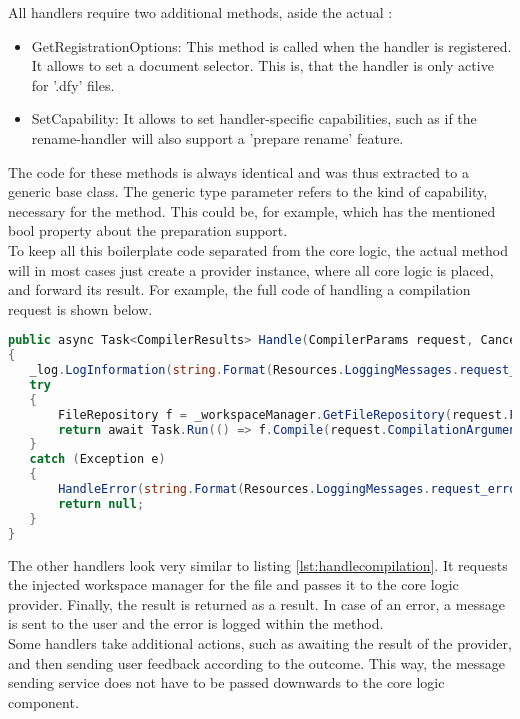 All handlers require two additional methods, aside the actual :
\begin{itemize}
    \item GetRegistrationOptions: This method is called when the handler is registered.
    It allows to set a document selector.
    This is, that the handler is only active for '.dfy' files.
    \item SetCapability: It allows to set handler-specific capabilities, such as if the rename-handler will also support a 'prepare rename' feature.
\end{itemize}
The code for these methods is always identical and was thus extracted to a generic base class.
The generic type parameter refers to the kind of capability, necessary for the  method.
This could be, for example,  which has the mentioned bool property about the preparation support.\\

To keep all this boilerplate code separated from the core logic, the actual  method will in most cases just create a provider instance, where all core logic is placed, and forward its result.
For example, the full code of handling a compilation request is shown below.

\begin{lstlisting}[language=csharp, caption={Handling Compilation}, captionpos=b, label={lst:handlecompilation}]
public async Task<CompilerResults> Handle(CompilerParams request, CancellationToken cancellationToken)
{
   _log.LogInformation(string.Format(Resources.LoggingMessages.request_handle, _method));
   try
   {
       FileRepository f = _workspaceManager.GetFileRepository(request.FileToCompile);
       return await Task.Run(() => f.Compile(request.CompilationArguments), cancellationToken);
   }
   catch (Exception e)
   {
       HandleError(string.Format(Resources.LoggingMessages.request_error, _method), e);
       return null;
   }
}
\end{lstlisting}

The other handlers look very similar to listing \ref{lst:handlecompilation}.
It requests the injected workspace manager for the file and passes it to the core logic provider.
Finally, the result is returned as a result.
In case of an error, a message is sent to the user and the error is logged within the  method.\\

Some handlers take additional actions, such as awaiting the result of the provider, and then sending user feedback according to the outcome.
This way, the message sending service does not have to be passed downwards to the core logic component.


